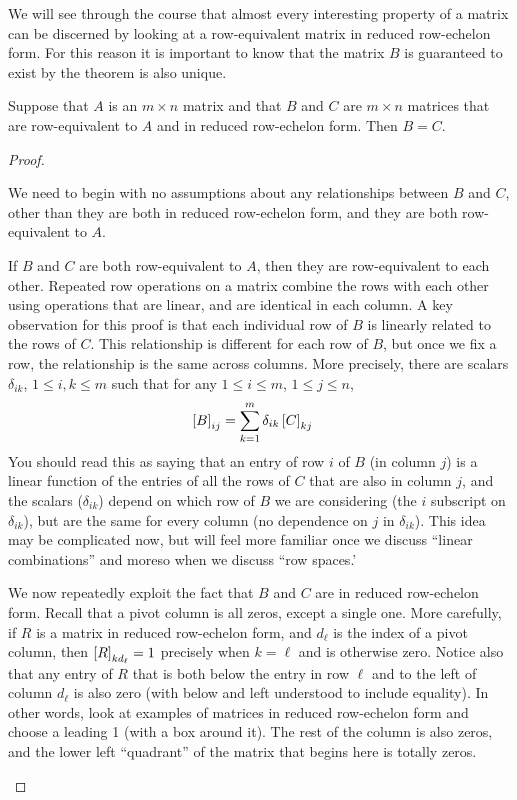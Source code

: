 \documentclass{ximera}
\begin{document}
We will see through the course that almost every interesting property
of a matrix can be discerned by looking at a row-equivalent matrix in
reduced row-echelon form.  For this reason it is important to know
that the matrix $B$ is guaranteed to exist by the theorem is also
unique.

\begin{theorem}
Suppose that $A$ is an $m\times n$ matrix and that $B$ and $C$ are $m\times n$ matrices that are row-equivalent to $A$ and in reduced row-echelon form.  Then $B=C$.

\begin{proof}
\begin{expandable}
We need to begin with no assumptions about any relationships between $B$ and $C$, other than they are both in reduced row-echelon form, and they are both row-equivalent to $A$.

If $B$ and $C$ are both row-equivalent to $A$, then they are row-equivalent to each other.  Repeated row operations on a matrix combine the rows with each other using operations that are linear, and are identical in each column.  A key observation for this proof is that each individual row of $B$ is linearly related to the rows of $C$.  This relationship is different for each row of $B$, but once we fix a row, the relationship is the same across columns.  More precisely, there are scalars $\delta_{ik}$, $1\leq i,k\leq m$ such that for any $1\leq i\leq m$, $1\leq j\leq n$,
\begin{align*}
\left\lbrack B\right\rbrack_{ij}
&=\sum_{k=1}^{m}\delta_{ik}\left\lbrack C\right\rbrack_{kj}
\end{align*}
You should read this as saying that an entry of row $i$ of $B$ (in column $j$) is a linear function of the entries of all the rows of $C$ that are also in column $j$, and the scalars ($\delta_{ik}$) depend on which row of $B$ we are considering (the $i$ subscript on $\delta_{ik}$), but are the same for every column (no dependence on $j$ in $\delta_{ik}$).  This idea may be complicated now, but will feel more familiar once we discuss ``linear combinations'' and moreso when we discuss ``row spaces.'

We now repeatedly exploit the fact that $B$ and $C$ are in reduced row-echelon form.  Recall that a pivot column is all zeros, except a single one.  More carefully, if $R$ is a matrix in reduced row-echelon form, and $d_\ell$ is the index of a pivot column, then $\left\lbrack R\right\rbrack_{kd_\ell}=1$ precisely when $k=\ell$ and is otherwise zero.  Notice also that any entry of $R$ that is both below the entry in row $\ell$ and to the left of column $d_\ell$ is also zero (with below and left understood to include equality).  In other words, look at examples of matrices in reduced row-echelon form and choose a leading 1 (with a box around it).  The rest of the column is also zeros, and the lower left ``quadrant'' of the matrix that begins here is totally zeros.


\end{expandable}
\end{proof}
\end{theorem}
\end{document}
